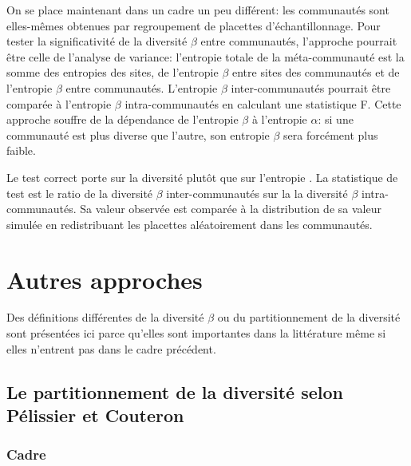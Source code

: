 \documentclass[
  11pt,
  french,
  a4paper,
  extrafontsizes,onecolumn,openright
  ]{memoir}
\begin{document}
On se place maintenant dans un cadre un peu différent: les communautés sont elles-mêmes obtenues par regroupement de placettes d'échantillonnage.
Pour tester la significativité de la diversité \(\beta\) entre communautés, l'approche pourrait être celle de l'analyse de variance: l'entropie totale de la méta-communauté est la somme des entropies des sites, de l'entropie \(\beta\) entre sites des communautés et de l'entropie \(\beta\) entre communautés.
L'entropie \(\beta\) inter-communautés pourrait être comparée à l'entropie \(\beta\) intra-communautés en calculant une statistique F.
Cette approche souffre de la dépendance de l'entropie \(\beta\) à l'entropie \(\alpha\): si une communauté est plus diverse que l'autre, son entropie \(\beta\) sera forcément plus faible.

Le test correct porte sur la diversité plutôt que sur l'entropie \autocite{Richard-Hansen2015}.
La statistique de test est le ratio de la diversité \(\beta\) inter-communautés sur la la diversité \(\beta\) intra-communautés.
Sa valeur observée est comparée à la distribution de sa valeur simulée en redistribuant les placettes aléatoirement dans les communautés.

\hypertarget{sec-betaAutres}{%
\chapter{Autres approches}\label{sec-betaAutres}}

Des définitions différentes de la diversité \(\beta\) ou du partitionnement de la diversité sont présentées ici parce qu'elles sont importantes dans la littérature même si elles n'entrent pas dans le cadre précédent.

\hypertarget{le-partitionnement-de-la-diversituxe9-selon-puxe9lissier-et-couteron}{%
\section{Le partitionnement de la diversité selon Pélissier et Couteron}\label{le-partitionnement-de-la-diversituxe9-selon-puxe9lissier-et-couteron}}

\hypertarget{sec-PCcadre}{%
\subsection{Cadre}\label{sec-PCcadre}}



\scriptsize
\end{document}
